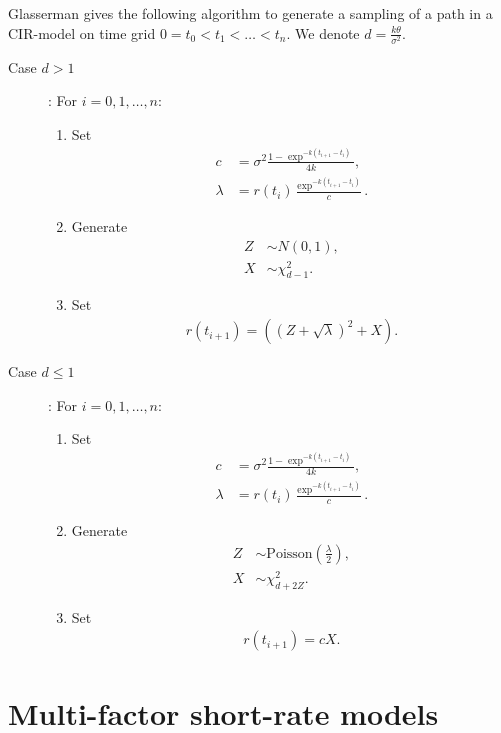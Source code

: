 Glasserman gives the following algorithm to generate a sampling of a path in a CIR-model on time grid $0 = t_0 < t_1 < \ldots < t_n$. We denote $d = \frac{k \theta}{\sigma^2}$.

\begin{description}
	\item[Case $d>1$]: For $i=0,1, \ldots, n$:
	\begin{enumerate}
		\item Set         
		\begin{align}
		c &= \sigma^2 \frac{ 1 - \exp^{ - k ( t_{i+1} - t_i ) } }{4 k}, \\
		\lambda &= r(t_i) \frac{ \exp^{ - k ( t_{i+1} - t_i ) } }{ c }.
		\end{align}
		\item Generate
		\begin{align}
		Z &\sim N(0,1), \\
		X &\sim \chi_{d-1}^2.
		\end{align}
		\item Set
		\begin{align}
		r(t_{i+1}) = \left( (Z + \sqrt{\lambda})^2 + X \right) .
		\end{align}
	\end{enumerate}
	\item[Case $d \leq 1$]: For $i=0,1, \ldots, n$:
	\begin{enumerate}
		\item Set         
		\begin{align}
		c &= \sigma^2 \frac{ 1 - \exp^{ - k ( t_{i+1} - t_i ) } }{4 k}, \\
		\lambda &= r(t_i) \frac{ \exp^{ - k ( t_{i+1} - t_i ) } }{ c }.
		\end{align}
		\item Generate
		\begin{align}
		Z &\sim \text{Poisson} ( \frac{\lambda}{2} ), \\
		X &\sim \chi_{d+2Z}^2.
		\end{align}
		\item Set
		\begin{align}
		r(t_{i+1}) = cX .
		\end{align}
	\end{enumerate}
\end{description}

\fi

\section{Multi-factor short-rate models}

